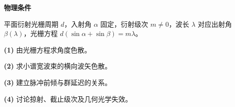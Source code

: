 \textbf{物理条件}\par 平面衍射光栅周期 \(d\)，入射角 \(\alpha\) 固定，衍射级次 \(m\ne0\)，波长 \(\lambda\) 对应出射角 \(\beta(\lambda)\)，光栅方程 \(d(\sin\alpha+\sin\beta)=m\lambda\)。
\par\noindent\textbf{(1)} 由光栅方程求角度色散。
\par\noindent\textbf{(2)} 求小谱宽波束的横向波矢色散。
\par\noindent\textbf{(3)} 建立脉冲前倾与群延迟的关系。
\par\noindent\textbf{(4)} 讨论掠射、截止级次及几何光学失效。
